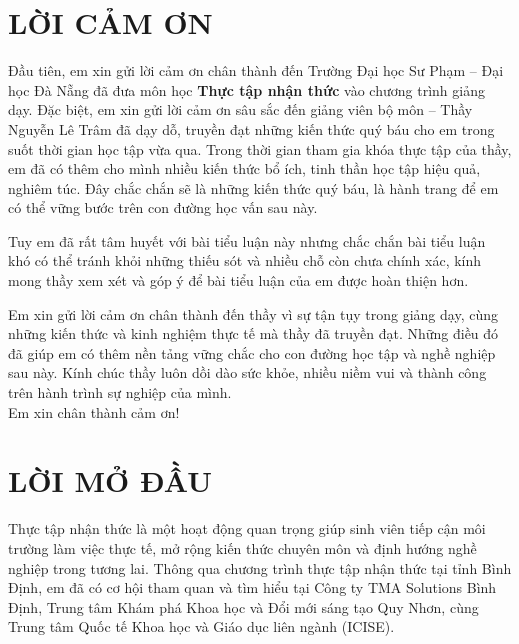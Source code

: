 \documentclass[12pt,a4paper]{report}
\begin{document}
	
	\tableofcontents
	\newpage
	\chapter*{\centering \large LỜI CẢM ƠN}
	\noindent
	
	Đầu tiên, em xin gửi lời cảm ơn chân thành đến Trường Đại học Sư Phạm – Đại học Đà Nẵng đã đưa môn học \textbf{Thực tập nhận thức} vào chương trình giảng dạy. Đặc biệt, em xin gửi lời cảm ơn sâu sắc đến giảng viên bộ môn – Thầy Nguyễn Lê Trâm đã dạy dỗ, truyền đạt những kiến thức quý báu cho em trong suốt thời gian học tập vừa qua. Trong thời gian tham gia khóa thực tập của thầy, em đã có thêm cho mình nhiều kiến thức bổ ích, tinh thần học tập hiệu quả, nghiêm túc. Đây chắc chắn sẽ là những kiến thức quý báu,  là hành trang để em có thể vững bước trên con đường học vấn sau này.\\
	\noindent
	
	Tuy em  đã rất tâm huyết với bài tiểu luận này nhưng chắc chắn bài tiểu luận khó có thể tránh khỏi những thiếu sót và nhiều chỗ còn chưa chính xác, kính mong thầy xem xét và góp ý để bài tiểu luận của em được hoàn thiện hơn. \\
	\noindent
	
	Em xin gửi lời cảm ơn chân thành đến thầy vì sự tận tụy trong giảng dạy, cùng những kiến thức và kinh nghiệm thực tế mà thầy đã truyền đạt. Những điều đó đã giúp em có thêm nền tảng vững chắc cho con đường học tập và nghề nghiệp sau này.
	Kính chúc thầy luôn dồi dào sức khỏe, nhiều niềm vui và thành công trên hành trình sự nghiệp của mình.\\
	
	Em xin chân thành cảm ơn!
	
	
	\newpage
	\chapter*{\centering \large LỜI MỞ ĐẦU}
	
	Thực tập nhận thức là một hoạt động quan trọng giúp sinh viên tiếp cận môi trường làm việc thực tế, mở rộng kiến thức chuyên môn và định hướng nghề nghiệp trong tương lai. Thông qua chương trình thực tập nhận thức tại tỉnh Bình Định, em đã có cơ hội tham quan và tìm hiểu tại Công ty TMA Solutions Bình Định, Trung tâm Khám phá Khoa học và Đổi mới sáng tạo Quy Nhơn, cùng Trung tâm Quốc tế Khoa học và Giáo dục liên ngành (ICISE).
	
\end{document}
